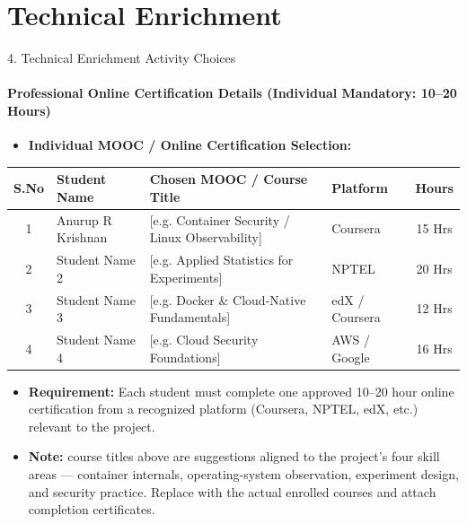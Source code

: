 \documentclass[aspectratio=169, 11pt]{beamer}
\begin{document}
\section{Technical Enrichment}
\begin{frame}{4. Technical Enrichment Activity Choices}
\framesubtitle{Professional Online Certification Details (Individual Mandatory: 10--20 Hours)}
    \begin{itemize}
        \item \textbf{Individual MOOC / Online Certification Selection:}
    \end{itemize}
    \vspace{-0.1cm}
    \begin{table}
        \centering
        \footnotesize
        \renewcommand{\arraystretch}{1.15}
        \begin{tabular}{|c|p{2.8cm}|p{5.0cm}|p{2.3cm}|c|}
            \hline
            \textbf{S.No} & \textbf{Student Name} & \textbf{Chosen MOOC / Course Title} & \textbf{Platform} & \textbf{Hours} \\
            \hline
            1 & Anurup R Krishnan & [e.g. Container Security / Linux Observability] & Coursera & 15 Hrs \\
            \hline
            2 & Student Name 2 & [e.g. Applied Statistics for Experiments] & NPTEL & 20 Hrs \\
            \hline
            3 & Student Name 3 & [e.g. Docker \& Cloud-Native Fundamentals] & edX / Coursera & 12 Hrs \\
            \hline
            4 & Student Name 4 & [e.g. Cloud Security Foundations] & AWS / Google & 16 Hrs \\
            \hline
        \end{tabular}
    \end{table}
    \vspace{0.15cm}
    \begin{itemize}
        \item {\scriptsize \textbf{Requirement:} Each student must complete one approved 10--20 hour online certification from a recognized platform (Coursera, NPTEL, edX, etc.) relevant to the project.}
        \item {\scriptsize \textbf{Note:} course titles above are suggestions aligned to the project's four skill areas --- container internals, operating-system observation, experiment design, and security practice. Replace with the actual enrolled courses and attach completion certificates.}
    \end{itemize}
\end{frame}
\end{document}
